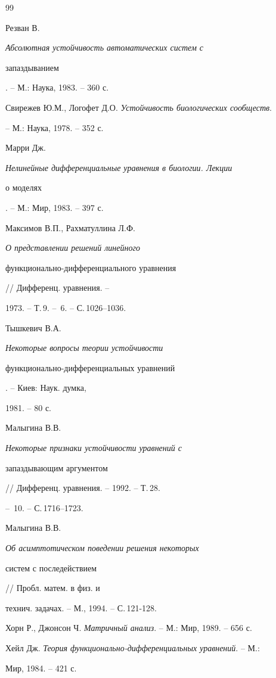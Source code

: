 \begin{thebibliography}{99} 


 




Резван В. {\em Абсолютная устойчивость автоматических систем с 


запаздыванием}. -- М.: Наука, 1983. -- 360 с. 




Свирежев Ю.М., Логофет Д.О. {\em Устойчивость биологических сообществ}. 


-- М.: Наука, 1978. -- 352 с. 


Марри Дж. {\em Нелинейные дифференциальные уравнения в биологии. Лекции 


о моделях}. -- М.: Мир, 1983. -- 397 с. 




Максимов В.П., Рахматуллина Л.Ф. {\em О представлении решений линейного 


функционально-дифференциального уравнения} // Дифференц. уравнения. -- 


1973. -- Т.\,9. -- \No\,6. -- С.\,1026--1036. 




Тышкевич В.А. {\em Некоторые вопросы теории устойчивости 


функционально-диф\-фе\-рен\-ци\-аль\-ных уравнений}. -- Киев: Наук. думка, 


1981. -- 80 с. 




Малыгина В.В. {\em Некоторые признаки устойчивости уравнений с 


запаздывающим аргументом} // Дифференц. уравнения. -- 1992. -- Т.\,28. 


-- \No\,10. -- С.\,1716--1723. 




Малыгина В.В. {\em Об асимптотическом поведении решения некоторых 


систем с последействием} // Пробл. матем. в физ. и 


технич. задачах. -- М., 1994. -- С.\,121-128. 




Хорн Р., Джонсон Ч. {\em Матричный анализ}. -- М.: Мир, 1989. -- 656 с. 




Хейл Дж. {\em Теория функционально-дифференциальных уравнений}. -- М.: 


Мир, 1984. -- 421 с. 


 


\end{thebibliography} 


 


\vskip 1cm 


 






 


\label{end} 


 


